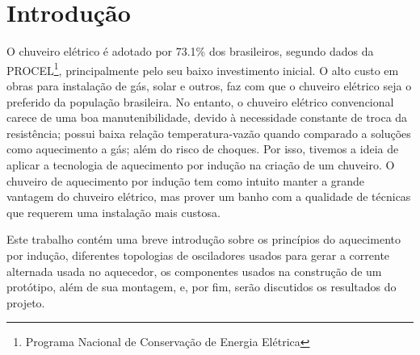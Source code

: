 \chapter*[Introdução]{Introdução}
O chuveiro elétrico é adotado por 73.1\% dos brasileiros, segundo dados da PROCEL\footnote{Programa Nacional de Conservação de Energia Elétrica}\cite{procel2007avaliaccao}, principalmente pelo seu baixo investimento inicial. O alto custo em obras para instalação de gás, solar e outros, faz com que o chuveiro elétrico seja o preferido da população brasileira. No entanto, o chuveiro elétrico convencional carece de uma boa manutenibilidade, devido à necessidade constante de troca da resistência; possui baixa relação temperatura-vazão quando comparado a soluções como aquecimento a gás; além do risco de choques. Por isso, tivemos a ideia de aplicar a tecnologia de aquecimento por indução na criação de um chuveiro. O chuveiro de aquecimento por indução tem como intuito manter a grande vantagem do chuveiro elétrico, mas prover um banho com a qualidade de técnicas que requerem uma instalação mais custosa.

Este trabalho contém uma breve introdução sobre os princípios do aquecimento por indução, diferentes topologias de osciladores usados para gerar a corrente alternada usada no aquecedor, os componentes usados na construção de um protótipo, além de sua montagem, e, por fim, serão discutidos os resultados do projeto.